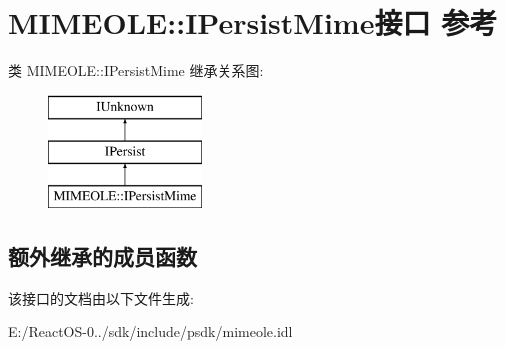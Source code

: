 \hypertarget{interface_m_i_m_e_o_l_e_1_1_i_persist_mime}{}\section{M\+I\+M\+E\+O\+LE\+:\+:I\+Persist\+Mime接口 参考}
\label{interface_m_i_m_e_o_l_e_1_1_i_persist_mime}
类 M\+I\+M\+E\+O\+LE\+:\+:I\+Persist\+Mime 继承关系图\+:\begin{figure}[H]
\begin{center}
\leavevmode
\includegraphics[height=3.000000cm]{interface_m_i_m_e_o_l_e_1_1_i_persist_mime}
\end{center}
\end{figure}
\subsection*{额外继承的成员函数}


该接口的文档由以下文件生成\+:\begin{DoxyCompactItemize}
\item 
E\+:/\+React\+O\+S-\/0../sdk/include/psdk/mimeole.\+idl\end{DoxyCompactItemize}
